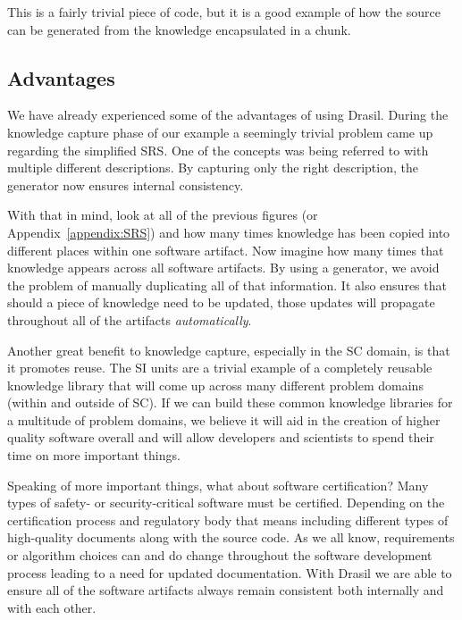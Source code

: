 \documentclass[preprint, 10pt]{sigplanconf}
\begin{document}
This is a fairly trivial piece of code, but it is a good example of how the
source can be generated from the knowledge encapsulated in a chunk.

\subsection{Advantages}
\label{subsec:advantages}

We have already experienced some of the advantages of using
Drasil. During the knowledge capture phase of our example a seemingly trivial
problem came up regarding the simplified SRS. One of the concepts was being
referred to with multiple different descriptions. By capturing only the right
description, the generator now ensures internal consistency.

With that in mind, look at all of the previous figures (or
Appendix~\ref{appendix:SRS}) and how many times knowledge has been copied into
different places within one software artifact. Now imagine how many times that
knowledge appears across all software artifacts. By using a generator, we avoid
the problem of manually duplicating all of that information. It also ensures
that should a piece of knowledge need to be updated, those updates will
propagate throughout all of the artifacts \emph{automatically}. 
	
Another great benefit to knowledge capture, especially in the SC domain, is that
it promotes reuse. The SI units are a trivial example of a completely reusable
knowledge library that will come up across many different problem domains
(within and outside of SC). If we can build these common knowledge libraries for
a multitude of problem domains, we believe it will aid in the creation of higher
quality software overall and will allow developers and scientists to spend their
time on more important things.

Speaking of more important things, what about software certification? Many types
of safety- or security-critical software must be certified. Depending on the
certification process and regulatory body that means including different types
of high-quality documents along with the source code. As we all know,
requirements or algorithm choices can and do change throughout the software
development process leading to a need for updated documentation. With Drasil we
are able to ensure all of the software artifacts always remain consistent both
internally and with each other.
\end{document}
